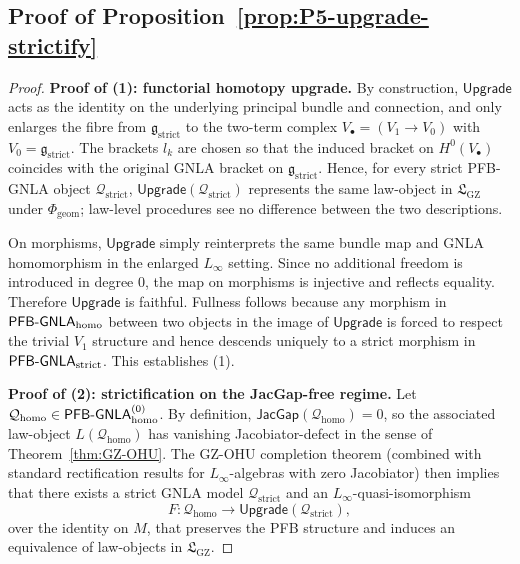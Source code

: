 \documentclass[11pt]{book}
\theoremstyle{plain}
\theoremstyle{definition}
\newcommand{\GZLS}{\ensuremath{\mathfrak{L}_{\mathrm{GZ}}}}       \newcommand{\GZLT}{\ensuremath{M_{!w}}}                           \newcommand{\GZLOC}{\ensuremath{A_M}}                             \newcommand{\GZLCurv}{\ensuremath{\mathcal{F}_{\mathrm{law}}}}
\begin{document}
\subsection*{Proof of Proposition~\ref{prop:P5-upgrade-strictify}}


\begin{proof}
\textbf{Proof of (1): functorial homotopy upgrade.}
By construction, \(\mathsf{Upgrade}\) acts as the identity on the
underlying principal bundle and connection, and only enlarges the
fibre from \(\mathfrak{g}_{\mathrm{strict}}\) to the two-term complex
\(V_\bullet=(V_1\to V_0)\) with \(V_0=\mathfrak{g}_{\mathrm{strict}}\).
The brackets \(l_k\) are chosen so that the induced bracket on
\(H^0(V_\bullet)\) coincides with the original GNLA bracket on
\(\mathfrak{g}_{\mathrm{strict}}\).  Hence, for every strict
PFB-GNLA object \(\mathcal{Q}_{\mathrm{strict}}\),
\(\mathsf{Upgrade}(\mathcal{Q}_{\mathrm{strict}})\) represents the
same law-object in \(\GZLS\) under \(\Phi_{\mathrm{geom}}\); law-level
procedures see no difference between the two descriptions.

On morphisms, \(\mathsf{Upgrade}\) simply reinterprets the same bundle
map and GNLA homomorphism in the enlarged \(L_\infty\) setting.  Since
no additional freedom is introduced in degree \(0\), the map on
morphisms is injective and reflects equality.  Therefore
\(\mathsf{Upgrade}\) is faithful.  Fullness follows because any
morphism in \(\mathsf{PFB\text- GNLA}_{\mathrm{homo}}\) between two
objects in the image of \(\mathsf{Upgrade}\) is forced to respect the
trivial \(V_1\) structure and hence descends uniquely to a strict
morphism in \(\mathsf{PFB\text- GNLA}_{\mathrm{strict}}\).  This
establishes \textnormal{(1)}.



\medskip\noindent
\textbf{Proof of (2): strictification on the JacGap-free regime.}
Let \(\mathcal{Q}_{\mathrm{homo}}\in
\mathsf{PFB\text- GNLA}_{\mathrm{homo}}^{(0)}\).  By definition,
\(\mathsf{JacGap}(\mathcal{Q}_{\mathrm{homo}})=0\), so the associated
law-object \(L(\mathcal{Q}_{\mathrm{homo}})\) has vanishing
Jacobiator-defect in the sense of Theorem~\ref{thm:GZ-OHU}.  The
GZ-OHU completion theorem (combined with standard rectification
results for \(L_\infty\)-algebras with zero Jacobiator) then implies
that there exists a strict GNLA model
\(\mathcal{Q}_{\mathrm{strict}}\) and an \(L_\infty\)-quasi-isomorphism
\[
  F :
  \mathcal{Q}_{\mathrm{homo}}
  \longrightarrow
  \mathsf{Upgrade}(\mathcal{Q}_{\mathrm{strict}}),
\]
over the identity on \(M\), that preserves the PFB structure and
induces an equivalence of law-objects in \(\GZLS\).


\end{proof}
\end{document}

